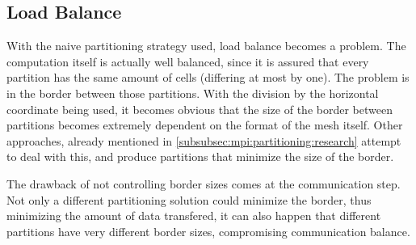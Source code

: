 \subsection{Load Balance}
\label{subsec:mpi:load}


With the naive partitioning strategy used, load balance becomes a problem.
The computation itself is actually well balanced, since it is assured that every partition has the same amount of cells (differing at most by one). The problem is in the border between those partitions.
With the division by the horizontal coordinate being used, it becomes obvious that the size of the border between partitions becomes extremely dependent on the format of the mesh itself.
Other approaches, already mentioned in \cref{subsubsec:mpi:partitioning:research} attempt to deal with this, and produce partitions that minimize the size of the border.

The drawback of not controlling border sizes comes at the communication step.
Not only a different partitioning solution could minimize the border, thus minimizing the amount of data transfered, it can also happen that different partitions have very different border sizes, compromising communication balance.
